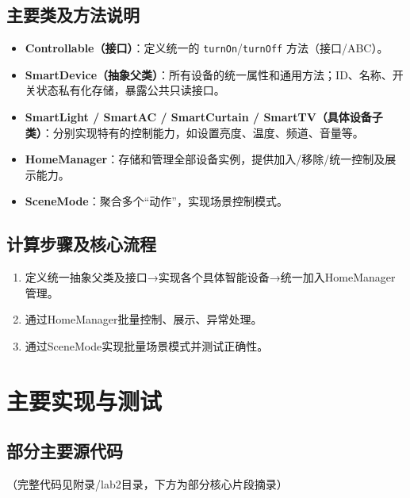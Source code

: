 \documentclass[12pt,hyperref,a4paper,UTF8]{ctexart}
\begin{document}
\subsection{主要类及方法说明}
\begin{itemize}
    \item \textbf{Controllable（接口）}：定义统一的 \texttt{turnOn}/\texttt{turnOff} 方法（接口/ABC）。
    \item \textbf{SmartDevice（抽象父类）}：所有设备的统一属性和通用方法；ID、名称、开关状态私有化存储，暴露公共只读接口。
    \item \textbf{SmartLight / SmartAC / SmartCurtain / SmartTV（具体设备子类）}：分别实现特有的控制能力，如设置亮度、温度、频道、音量等。
    \item \textbf{HomeManager}：存储和管理全部设备实例，提供加入/移除/统一控制及展示能力。
    \item \textbf{SceneMode}：聚合多个“动作”，实现场景控制模式。
\end{itemize}

\subsection{计算步骤及核心流程}
\begin{enumerate}
    \item 定义统一抽象父类及接口→实现各个具体智能设备→统一加入HomeManager管理。
    \item 通过HomeManager批量控制、展示、异常处理。
    \item 通过SceneMode实现批量场景模式并测试正确性。
\end{enumerate}

\section{主要实现与测试}
\subsection{部分主要源代码}
（完整代码见附录/lab2目录，下方为部分核心片段摘录）
\end{document}
